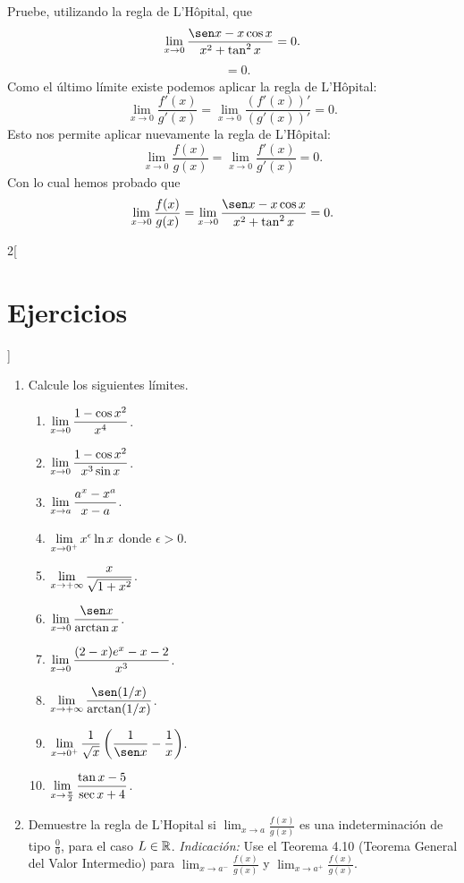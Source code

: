 \begin{exemplo}[Solución]{%
Pruebe, utilizando la regla de L'Hôpital, que
\begin{equation*}
	\lim_{x \to 0}\frac{\sen x-x\cos x}{x^2+\tan^2x}=0.
\end{equation*}
}
\begin{align*}
 &=0.
\end{align*}
Como el último límite existe podemos aplicar la regla de L'Hôpital:
\begin{equation*}
	\lim_{x \to 0}\frac{f'(x)}{g'(x)}=\lim_{x \to 0}\frac{(f'(x))'}{(g'(x))'}= 0.
\end{equation*}
Esto nos permite aplicar nuevamente la regla de L'Hôpital:
\begin{equation*}
	\lim_{x \to 0}\frac{f(x)}{g(x)}=\lim_{x \to 0}\frac{f'(x)}{g'(x)}= 0.
\end{equation*}
Con lo cual hemos probado que
\begin{equation*}
	\lim_{x \to 0}\frac{f(x)}{g(x)}=\lim_{x \to 0}\frac{\sen x-x\cos x}{x^2+\tan^2x}=0.
\end{equation*}
\end{exemplo}

\begin{multicols}{2}[\section{Ejercicios}]
\begingroup
\small
\begin{enumerate}[leftmargin=*]
\item Calcule los siguientes límites.
    \begin{enumerate}[leftmargin=*]
    \item $\displaystyle \limjc{\frac{1 - \cos x^2}{x^4}}{x}{0}$.
    \item $\displaystyle \limjc{\frac{1 - \cos x^2}{x^3\sin x}}{x}{0}$.
    \item $\displaystyle \limjc{\frac{a^x - x^a}{x - a}}{x}{a}$.
    \item $\displaystyle \limjc{x^\epsilon\ln x}{x}{0^+}$ donde $\epsilon > 0$.
    \item $\displaystyle \limjc{\frac{x}{\sqrt{1 + x^2}}}{x}{+\infty}$.
    \item $\displaystyle \limjc{\frac{\sen x}{\arctan x}}{x}{0}$.
    \item $\displaystyle \limjc{\frac{(2 - x)e^x - x - 2}{x^3}}{x}{0}$.
    \item $\displaystyle \limjc{\frac{\sen(1/x)}{\arctan(1/x)}}{x}{+\infty}$.
    \item $\displaystyle \limjc{\frac{1}{\sqrt{x}}\left(\frac{1}{\sen x} -
        \frac{1}{x}\right)}{x}{0^+}$.
    \item $\displaystyle \limjc{\frac{\tan x - 5}{\sec x + 4}}{x}{\frac{\pi}{2}}$.
    \end{enumerate}
\item Demuestre la regla de L'Hopital si $\displaystyle\lim_{x\to a}\frac{f(x)}{g(x)}$ es una indeterminación de tipo $\frac 00$, para el caso $L\in\Rbb$. \emph{Indicación: }Use el Teorema 4.10 (Teorema General del Valor Intermedio) para $\displaystyle\lim_{x\to a^-}\frac{f(x)}{g(x)}$ y $\displaystyle\lim_{x\to a^+}\frac{f(x)}{g(x)}$.
\end{enumerate}
\endgroup

\end{multicols}

